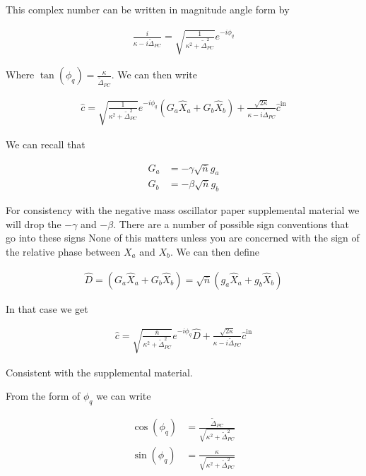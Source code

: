 \documentclass[12pt]{article}
\begin{document}
This complex number can be written in magnitude angle form by

\begin{align}
\frac{i}{\kappa - i \tilde{\Delta}_{PC}} = \sqrt{\frac{1}{\kappa^2 + \tilde{\Delta}_{PC}^2}} e^{-i\phi_q}
\end{align}

Where $\tan(\phi_q) = \frac{\kappa}{\tilde{\Delta}_{PC}}$. We can then write

\begin{align}
\hat{c} = \sqrt{\frac{1}{\kappa^2 + \tilde{\Delta}_{PC}^2}} e^{-i\phi_q}\left(G_a \hat{X}_a + G_b \hat{X}_b\right) + \frac{\sqrt{2\kappa}}{\kappa - i\tilde{\Delta}_{PC}} \hat{c}^{\text{in}}
\end{align}

We can recall that

\begin{align}
G_a &= -\gamma \sqrt{\bar{n}} g_a\\
G_b &= -\beta \sqrt{\bar{n}} g_b
\end{align}

For consistency with the negative mass oscillator paper supplemental material we will drop the $-\gamma$ and $-\beta$. There are a number of possible sign conventions that go into these signs None of this matters unless you are concerned with the sign of the relative phase between $X_a$ and $X_b$. We can then define

\begin{align}
\hat{D} = \left(G_a \hat{X}_a + G_b \hat{X}_b\right) = \sqrt{\bar{n}} \left(g_a \hat{X}_a + g_b \hat{X}_b\right)
\end{align}

In that case we get

\begin{align}
\hat{c} = \sqrt{\frac{\bar{n}}{\kappa^2 + \tilde{\Delta}_{PC}^2}} e^{-i\phi_q}\hat{D} + \frac{\sqrt{2\kappa}}{\kappa - i\tilde{\Delta}_{PC}} \hat{c}^{\text{in}}
\end{align}

Consistent with the supplemental material.

From the form of $\phi_q$ we can write

\begin{align}
\cos(\phi_q) &= \frac{\tilde{\Delta}_{PC}}{\sqrt{\kappa^2 + \tilde{\Delta}_{PC}^2}}\\
\sin(\phi_q) &= \frac{\kappa}{\sqrt{\kappa^2 + \tilde{\Delta}_{PC}^2}}\\
\end{align}
\end{document}
